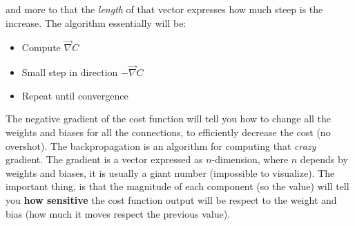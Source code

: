 \documentclass{article}
\begin{document}
and more to that the \textit{length} of that vector expresses how much steep is the increase.
The algorithm essentially will be:
\begin{itemize}
    \item Compute $\vec{\nabla}C$
    \item Small step in direction $-\vec{\nabla}C$
    \item Repeat until convergence
\end{itemize}
The negative gradient of the cost function will tell you how to change all the weights and biases
for all the connections, to efficiently decrease the cost (no overshot). The backpropagation
is an algorithm for computing that \textit{crazy} gradient.
\newline\newline
The gradient is a vector expressed as $n$-dimension, where $n$ depends by weights and biases,
it is usually a giant number (impossible to visualize). The important thing, is that the
magnitude of each component (so the value) will tell you \textbf{how sensitive} the
cost function output will be respect to the weight and bias (how much it moves respect the previous
value).
\end{document}
